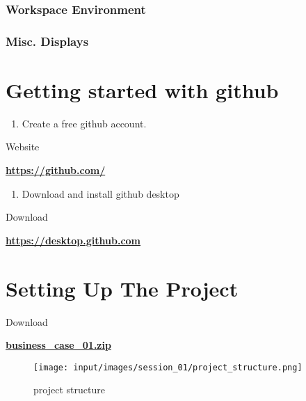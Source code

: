 \documentclass[]{article}
\providecommand{\tightlist}{%
  \setlength{\itemsep}{0pt}\setlength{\parskip}{0pt}}
\newenvironment{rmdattachment}
  {\begin{center}}
  {\end{center}}
\newenvironment{rmdwebsite}
  {\begin{center}}
  {\end{center}}
\newenvironment{rmdblankbox}
  {\begin{center}}
  {\end{center}}
\begin{document}
\hypertarget{workspace-environment}{%
\subsubsection{Workspace Environment}\label{workspace-environment}}

\hypertarget{misc.-displays}{%
\subsubsection{Misc. Displays}\label{misc.-displays}}

\hypertarget{getting-started-with-github}{%
\section{Getting started with github}\label{getting-started-with-github}}

\begin{enumerate}
\def\labelenumi{\arabic{enumi}.}
\tightlist
\item
  Create a free github account.
\end{enumerate}

\begin{rmdblankbox}
Website
\end{rmdblankbox}
\begin{rmdwebsite}
\textbf{\url{https://github.com/}}
\end{rmdwebsite}

\begin{enumerate}
\def\labelenumi{\arabic{enumi}.}
\setcounter{enumi}{1}
\tightlist
\item
  Download and install github desktop
\end{enumerate}

\begin{rmdblankbox}
Download
\end{rmdblankbox}
\begin{rmdattachment}
\textbf{\url{https://desktop.github.com}}
\end{rmdattachment}

\hypertarget{setting-up-the-project}{%
\section{Setting Up The Project}\label{setting-up-the-project}}

\begin{rmdblankbox}
Download
\end{rmdblankbox}
\begin{rmdattachment}
\textbf{\href{https://github.com/TUHH-W11/data-science/blob/master/files/session_01/business_case_01.zip}{business\_case\_01.zip}}
\end{rmdattachment}

\begin{figure}
\centering
\texttt{[image: input/images/session\_01/project\_structure.png]}
\caption{project structure}
\end{figure}
\end{document}
